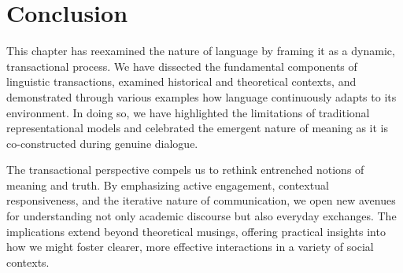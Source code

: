 \documentclass[12pt]{article}
\begin{document}
\section{Conclusion}

This chapter has reexamined the nature of language by framing it as a dynamic, transactional process. We have dissected the fundamental components of linguistic transactions, examined historical and theoretical contexts, and demonstrated through various examples how language continuously adapts to its environment. In doing so, we have highlighted the limitations of traditional representational models and celebrated the emergent nature of meaning as it is co-constructed during genuine dialogue.

The transactional perspective compels us to rethink entrenched notions of meaning and truth. By emphasizing active engagement, contextual responsiveness, and the iterative nature of communication, we open new avenues for understanding not only academic discourse but also everyday exchanges. The implications extend beyond theoretical musings, offering practical insights into how we might foster clearer, more effective interactions in a variety of social contexts.

\printbibliography[title=References]
\end{document}

